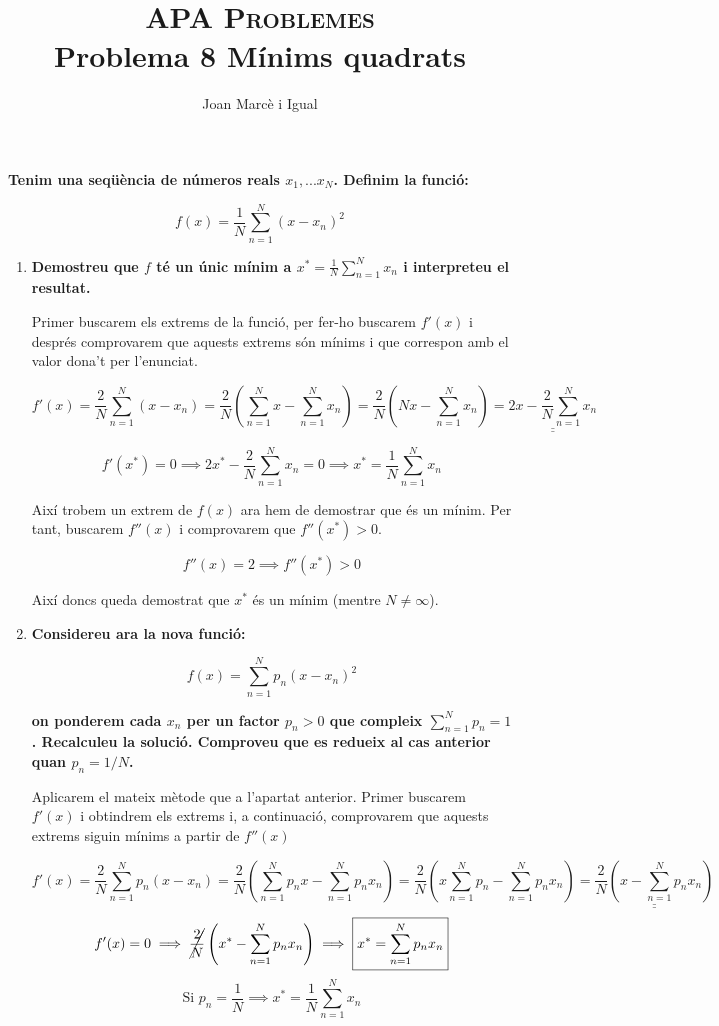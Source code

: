 \documentclass[a4paper]{article}
\title{\textsc{APA Problemes} \\ Problema 8 Mínims quadrats}
\author{Joan Marcè i Igual}
\date{}
\begin{document}
\maketitle

\textbf{Tenim una seqüència de números reals $x_1,...x_N$. Definim la funció:}

$$ f(x) = \frac{1}{N}\sum_{n=1}^N(x - x_n)^2 $$

\begin{enumerate}

\item \textbf{Demostreu que $f$ té un únic mínim a $x^* = \frac{1}{N} \sum_{n=1}^N x_n$ i interpreteu el resultat.}

Primer buscarem els extrems de la funció, per fer-ho buscarem $f'(x)$ i després comprovarem que aquests extrems són mínims i que correspon amb el valor dona't per l'enunciat.

$$ f'(x) = \frac{2}{N}\sum_{n=1}^N (x - x_n) = \frac{2}{N}\left(\sum_{n=1}^N x - \sum_{n=1}^N x_n \right) = \frac{2}{N}\left(Nx - \sum_{n=1}^N x_n \right) = \underline{\underline{2x - \frac{2}{N}\sum_{n=1}^N x_n}} $$

$$ f'(x^*) = 0 \implies 2x^* - \frac{2}{N}\sum_{n=1}^N x_n = 0 \implies \boxed{x^* = \frac{1}{N}\sum_{n=1}^N x_n} $$

Així trobem un extrem de $f(x)$ ara hem de demostrar que és un mínim. Per tant, buscarem $f''(x)$ i comprovarem que $f''(x^*) > 0$.

$$ f''(x) = 2 \implies f''(x^*) > 0 $$

Així doncs queda demostrat que $x^*$ és un mínim (mentre $ N \ne \infty $).

\item \textbf{Considereu ara la nova funció:}

$$ f(x) = \sum_{n=1}^N p_n (x - x_n)^2 $$

\textbf{on ponderem cada $x_n$ per un factor $p_n > 0$ que compleix $\sum_{n=1}^N p_n = 1$. Recalculeu la solució. Comproveu que es redueix al cas anterior quan $p_n = 1/N$.}

Aplicarem el mateix mètode que a l'apartat anterior. Primer buscarem $f'(x)$ i obtindrem els extrems i, a continuació, comprovarem que aquests extrems siguin mínims a partir de $f''(x)$

$$ 
f'(x) = \frac{2}{N} \sum_{n=1}^N p_n(x - x_n) = 
\frac{2}{N}\left(\sum_{n=1}^N p_n x - \sum_{n=1}^N p_n x_n\right) = 
\frac{2}{N}\left(x\sum_{n=1}^N p_n - \sum_{n=1}^N p_n x_n\right) = 
\underline{\underline{\frac{2}{N}\left(x - \sum_{n=1}^N p_n x_n\right)}} 
$$
$$
f'(x) = 0 \implies \cancel{\frac{2}{N}}\left(x^* - \sum_{n=1}^N p_n x_n\right) \implies
\boxed{x^* = \sum_{n=1}^N p_n x_n}
$$
$$
\text{Si } p_n = \frac{1}{N} \implies \boxed{x^* = \frac{1}{N}\sum_{n=1}^N x_n}
$$


\end{enumerate}
\end{document}
